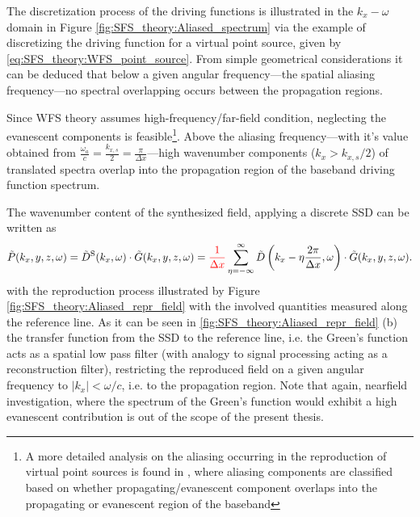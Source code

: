 The discretization process of the driving functions is illustrated in the $k_x-\omega$ domain in Figure \ref{fig:SFS_theory:Aliased_spectrum} via the example of discretizing the driving function for a virtual point source, given by \eqref{eq:SFS_theory:WFS_point_source}.
From simple geometrical considerations it can be deduced that below a given angular frequency---the spatial aliasing frequency---no spectral overlapping occurs between the propagation regions.

Since WFS theory assumes high-frequency/far-field condition, neglecting the evanescent components is feasible\footnote{A more detailed analysis on the aliasing occurring in the reproduction of virtual point sources is found in \cite{spors2009spatial}, where aliasing components are classified based on whether propagating/evanescent component overlaps into the propagating or evanescent region of the baseband}. 
Above the aliasing frequency---with it's value obtained from $\frac{\omega_a }{c} = \frac{k_{x,s}}{2}= \frac{\pi}{\Delta x}$---high wavenumber components ($k_x>k_{x,s}/2$) of translated spectra overlap into the propagation region of the baseband driving function spectrum.

The wavenumber content of the synthesized field, applying a discrete SSD can be written as
\begin{equation}
\tilde{P}(k_x,y,z, \omega) = \tilde{D}^{\mathrm{S}}(k_x,\omega) \cdot \tilde{G}(k_x,y,z, \omega) = \textcolor{red}{\frac{1}{\Delta x}}
\sum_{\eta = -\infty}^{\infty} \tilde{D}\left(k_x - \eta \frac{2\pi}{\Delta x},\omega \right)  \cdot \tilde{G}(k_x,y,z, \omega).
\label{Eq:SFS_theory:Aliased_field_sp}
\end{equation}
with the reproduction process illustrated by Figure \ref{fig:SFS_theory:Aliased_repr_field} with the involved quantities measured along the reference line.
As it can be seen in \ref{fig:SFS_theory:Aliased_repr_field} (b) the transfer function from the SSD to the reference line, i.e. the Green's function acts as a spatial low pass filter (with analogy to signal processing acting as a reconstruction filter), restricting the reproduced field on a given angular frequency to $|k_x| < \omega/c$, i.e. to the propagation region.
Note that again, nearfield investigation, where the spectrum of the Green's function would exhibit a high evanescent contribution is out of the scope of the present thesis.

